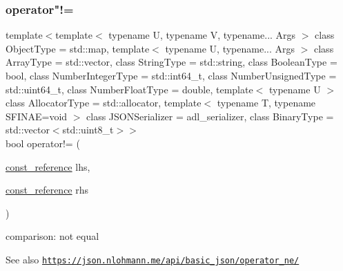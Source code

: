 \subsubsection{\texorpdfstring{operator"!=}{operator!=}\hspace{0.1cm}{\footnotesize\ttfamily [1/3]}}
{\footnotesize\ttfamily template$<$template$<$ typename U, typename V, typename... Args $>$ class Object\+Type = std\+::map, template$<$ typename U, typename... Args $>$ class Array\+Type = std\+::vector, class String\+Type  = std\+::string, class Boolean\+Type  = bool, class Number\+Integer\+Type  = std\+::int64\+\_\+t, class Number\+Unsigned\+Type  = std\+::uint64\+\_\+t, class Number\+Float\+Type  = double, template$<$ typename U $>$ class Allocator\+Type = std\+::allocator, template$<$ typename T, typename S\+F\+I\+N\+A\+E=void $>$ class J\+S\+O\+N\+Serializer = adl\+\_\+serializer, class Binary\+Type  = std\+::vector$<$std\+::uint8\+\_\+t$>$$>$ \\
bool operator!= (\begin{DoxyParamCaption}\item[{\hyperlink{classnlohmann_1_1basic__json_ab8a1c33ee7b154fc41ca2545aa9724e6}{const\+\_\+reference}}]{lhs,  }\item[{\hyperlink{classnlohmann_1_1basic__json_ab8a1c33ee7b154fc41ca2545aa9724e6}{const\+\_\+reference}}]{rhs }\end{DoxyParamCaption})\hspace{0.3cm}{\ttfamily [friend]}}



comparison\+: not equal 

\begin{DoxySeeAlso}{See also}
\href{https://json.nlohmann.me/api/basic_json/operator_ne/}{\tt https\+://json.\+nlohmann.\+me/api/basic\+\_\+json/operator\+\_\+ne/} 
\end{DoxySeeAlso}
\mbox{\label{classnlohmann_1_1basic__json_a4d581dc2ab78091885f9af24d13749dc}} 
